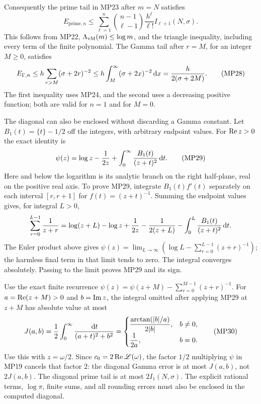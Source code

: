 Consequently the prime tail in MP23 after $m=N$ satisfies
\begin{equation}
 E_{\mathrm{prime},n}\leq
 \sum_{\ell=1}^n\binom{n-1}{\ell-1}\frac{h^\ell}{\ell!}
                                     I_{\ell+1}(N,\sigma).
 \tag{MP27}
\end{equation}
This follows from MP22, $\Lambda_{\mathrm{vM}}(m)\leq\log m$, and the triangle inequality,
including every term of the finite polynomial. The Gamma tail after
$r=M$, for an integer $M\geq0$, satisfies
\begin{equation}
 E_{\Gamma,n}\leq h\sum_{r>M}(\sigma+2r)^{-2}
       \leq h\int_M^\infty(\sigma+2x)^{-2}\,\mathrm d x
       =\frac h{2(\sigma+2M)}.\tag{MP28}
\end{equation}
The first inequality uses MP24, and the second uses a decreasing positive
function; both are valid for $n=1$ and for $M=0$.

The diagonal can also be enclosed without discarding a Gamma constant.
Let $B_1(t)=\{t\}-1/2$ off the integers, with arbitrary endpoint values.
For $\operatorname{Re} z>0$ the exact identity is
\begin{equation}
 \psi(z)=\log z-\frac1{2z}
       +\int_0^\infty\frac{B_1(t)}{(z+t)^2}\,\mathrm d t.
 \tag{MP29}
\end{equation}
Here and below the logarithm is its analytic branch on the right
half-plane, real on the positive real axis. To prove MP29, integrate
$B_1(t)f'(t)$ separately on each interval $[r,r+1]$ for
$f(t)=(z+t)^{-1}$. Summing the endpoint values gives, for integral $L>0$,
\[
 \sum_{r=0}^{L-1}\frac1{z+r}
 =\log(z+L)-\log z+\frac1{2z}-\frac1{2(z+L)}
                  -\int_0^L\frac{B_1(t)}{(z+t)^2}\,\mathrm d t.
\]
The Euler product above gives
$\psi(z)=\lim_{L\to\infty}(\log L-\sum_{r=0}^{L-1}(z+r)^{-1})$;
the harmless final term in that limit tends to zero. The integral
converges absolutely. Passing to the limit proves MP29 and its sign.

Use the exact finite recurrence
$\psi(z)=\psi(z+M)-\sum_{r=0}^{M-1}(z+r)^{-1}$.
For $a=\operatorname{Re}(z+M)>0$ and $b=\operatorname{Im} z$, the integral omitted after applying
MP29 at $z+M$ has absolute value at most
\begin{equation}
 J(a,b)=\frac12\int_0^\infty\frac{\,\mathrm d t}{(a+t)^2+b^2}
 =\begin{cases}
 \displaystyle\frac{\arctan(|b|/a)}{2|b|},&b\ne0,\\[5pt]
 \displaystyle\frac1{2a},&b=0.
 \end{cases}\tag{MP30}
\end{equation}
Use this with $z=\omega/2$. Since $c_0=2\operatorname{Re}\mathscr L(\omega)$, the
factor $1/2$ multiplying $\psi$ in MP19 cancels that factor $2$:
the diagonal Gamma error is at most $J(a,b)$, not $2J(a,b)$.
The diagonal prime tail is at most $2I_1(N,\sigma)$.
The explicit rational terms, $\log\pi$, finite sums, and all rounding
errors must also be enclosed in the computed diagonal.

